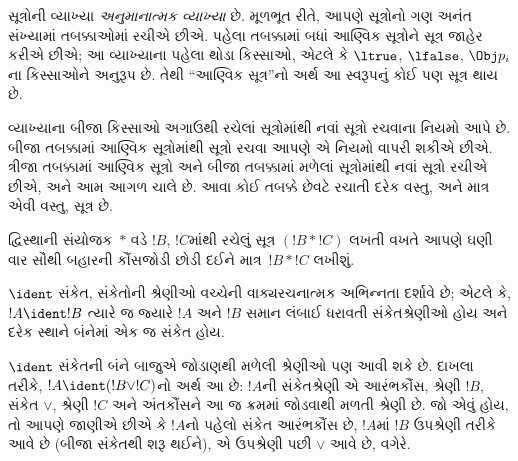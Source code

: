 \begin{explain}
સૂત્રોની વ્યાખ્યા \emph{અનુમાનાત્મક વ્યાખ્યા} છે. મૂળભૂત રીતે,
આપણે સૂત્રોનો ગણ અનંત સંખ્યામાં તબક્કાઓમાં રચીએ છીએ. પહેલા
તબક્કામાં બધાં આણ્વિક સૂત્રોને સૂત્ર જાહેર કરીએ છીએ; આ વ્યાખ્યાના
પહેલા થોડા કિસ્સાઓ, એટલે કે
$\ltrue$, %
$\lfalse$, %
$\Obj p_i$ના કિસ્સાઓને અનુરૂપ છે. તેથી ``આણ્વિક સૂત્ર''નો અર્થ
આ સ્વરૂપનું કોઈ પણ સૂત્ર થાય છે.

વ્યાખ્યાના બીજા કિસ્સાઓ અગાઉથી રચેલાં સૂત્રોમાંથી નવાં
સૂત્રો રચવાના નિયમો આપે છે. બીજા તબક્કામાં આણ્વિક
સૂત્રોમાંથી સૂત્રો રચવા આપણે એ નિયમો વાપરી શકીએ છીએ.
ત્રીજા તબક્કામાં આણ્વિક સૂત્રો અને બીજા તબક્કામાં મળેલાં સૂત્રોમાંથી
નવાં સૂત્રો રચીએ છીએ, અને આમ આગળ ચાલે છે. આવા કોઈ તબક્કે છેવટે
રચાતી દરેક વસ્તુ, અને માત્ર એવી વસ્તુ, સૂત્ર છે.
\end{explain}

દ્વિસ્થાની સંયોજક~$\ast$ વડે $!B$, $!C$માંથી રચેલું સૂત્ર
$(!B \ast !C)$ લખતી વખતે આપણે ઘણી વાર સૌથી બહારની કૌંસજોડી છોડી
દઈને માત્ર~$!B \ast !C$ લખીશું.



\begin{defn}[વાક્યરચનાત્મક અભિન્નતા]
$\ident$ સંકેત, સંકેતોની શ્રેણીઓ વચ્ચેની વાક્યરચનાત્મક અભિન્નતા
દર્શાવે છે; એટલે કે, $!A \ident !B$ ત્યારે જ જ્યારે $!A$ અને $!B$
સમાન લંબાઈ ધરાવતી સંકેતશ્રેણીઓ હોય અને દરેક સ્થાને બંનેમાં એક જ
સંકેત હોય.
\end{defn}

$\ident$ સંકેતની બંને બાજુએ જોડાણથી મળેલી શ્રેણીઓ પણ આવી શકે છે.
દાખલા તરીકે, $!A \ident (!B \lor !C)$નો અર્થ આ છે: $!A$ની
સંકેતશ્રેણી એ આરંભકૌંસ, શ્રેણી $!B$, સંકેત $\lor$, શ્રેણી $!C$ અને
અંતકૌંસને આ જ ક્રમમાં જોડવાથી મળતી શ્રેણી છે. જો એવું હોય, તો આપણે
જાણીએ છીએ કે $!A$નો પહેલો સંકેત આરંભકૌંસ છે, $!A$માં $!B$ ઉપશ્રેણી
તરીકે આવે છે (બીજા સંકેતથી શરૂ થઈને), એ ઉપશ્રેણી પછી $\lor$ આવે છે,
વગેરે.
\endgroup


\begingroup
\makeatletter{}\makeatother


\label{guunit:OLP-0059}


